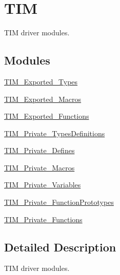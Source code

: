 \hypertarget{group___t_i_m}{}\section{T\+IM}
\label{group___t_i_m}


T\+IM driver modules.  


\subsection*{Modules}
\begin{DoxyCompactItemize}
\item 
\mbox{\hyperlink{group___t_i_m___exported___types}{T\+I\+M\+\_\+\+Exported\+\_\+\+Types}}
\item 
\mbox{\hyperlink{group___t_i_m___exported___macros}{T\+I\+M\+\_\+\+Exported\+\_\+\+Macros}}
\item 
\mbox{\hyperlink{group___t_i_m___exported___functions}{T\+I\+M\+\_\+\+Exported\+\_\+\+Functions}}
\item 
\mbox{\hyperlink{group___t_i_m___private___types_definitions}{T\+I\+M\+\_\+\+Private\+\_\+\+Types\+Definitions}}
\item 
\mbox{\hyperlink{group___t_i_m___private___defines}{T\+I\+M\+\_\+\+Private\+\_\+\+Defines}}
\item 
\mbox{\hyperlink{group___t_i_m___private___macros}{T\+I\+M\+\_\+\+Private\+\_\+\+Macros}}
\item 
\mbox{\hyperlink{group___t_i_m___private___variables}{T\+I\+M\+\_\+\+Private\+\_\+\+Variables}}
\item 
\mbox{\hyperlink{group___t_i_m___private___function_prototypes}{T\+I\+M\+\_\+\+Private\+\_\+\+Function\+Prototypes}}
\item 
\mbox{\hyperlink{group___t_i_m___private___functions}{T\+I\+M\+\_\+\+Private\+\_\+\+Functions}}
\end{DoxyCompactItemize}


\subsection{Detailed Description}
T\+IM driver modules. 

